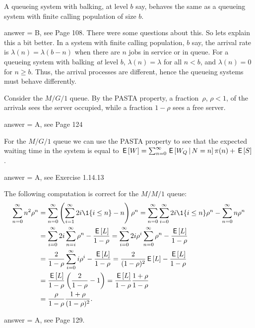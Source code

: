 \begin{exercise}[201803]
A queueing system with balking, at level $b$ say, behaves the same as a queueing system with finite calling   population of size $b$.
\begin{solution}
answer = B, see Page 108. There were some questions about this. So lets explain this a bit better. In a system with finite calling population, $b$ say, the arrival rate is $\lambda(n) = \lambda(b-n)$ when there are $n$ jobs in service or in queue. For a queueing system with balking \emph{at} level $b$, $\lambda(n)=\lambda$ for all $n<b$, and $\lambda(n)=0$ for $n\geq b$. Thus, the arrival processes are different, hence the queueing systems must behave differently.
\end{solution}
\end{exercise}

\begin{exercise}[201803]
Consider the $M/G/1$ queue. 
By the PASTA property, a fraction~$\rho$, $\rho<1$,  of the arrivals sees the server occupied, while a fraction $1-\rho$ sees a free server.  
\begin{solution}
answer = A, see Page 124
\end{solution}
\end{exercise}

\begin{exercise}[201803]
For the $M/G/1$ queue we can   use the PASTA property to see that the expected waiting time in the
  system is equal to
  $\,\mathsf{E}\left[W\right] = \sum_{n=0}^\infty \,\mathsf{E}\left[W_Q \,\middle|\, N=n\right] \pi(n) + \,\mathsf{E}\left[S\right]$.
\begin{solution}
answer = A, see Exercise 1.14.13
\end{solution}
\end{exercise}

\begin{exercise}[201803]
The following computation is correct for the $M/M/1$ queue:
\begin{equation*}
  \begin{split}
    \sum_{n=0}^\infty n^2 \rho^n 
&=    \sum_{n=0}^\infty \left(\sum_{i=1}^\infty 2i \1{i\leq n}  - n\right)\rho^n 
=    \sum_{n=0}^\infty \sum_{i=0}^\infty 2i\1{i\leq n}\rho^n  - \sum_{n=0}^\infty n\rho^n \\
&=    \sum_{i=0}^\infty 2i \sum_{n=i}^\infty \rho^n  - \frac{\E L}{1-\rho} 
=    \sum_{i=0}^\infty 2i \rho^i \sum_{n=0}^\infty \rho^n  - \frac{\E L}{1-\rho} \\
&=    \frac2{1-\rho} \sum_{i=0}^\infty i \rho^i   - \frac{\E L}{1-\rho} 
=    \frac2{(1-\rho)^2} \E L - \frac{\E L}{1-\rho} \\
&=    \frac{\E L}{1-\rho}  \left(\frac2{1-\rho}  - 1\right) 
=    \frac{\E L}{1-\rho}  \frac{1+\rho}{1-\rho} \\
&=    \frac{\rho}{1-\rho}  \frac{1+\rho}{(1-\rho)^2}.
\end{split}
\end{equation*}

\begin{solution}
answer = A, see Page 129. 
\end{solution}
\end{exercise}

